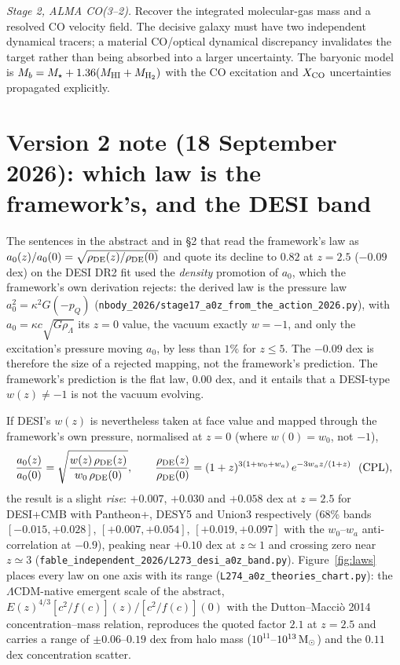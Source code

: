 \documentclass[11pt,letterpaper]{article}
\begin{document}
\emph{Stage 2, ALMA CO(3--2).} Recover the integrated molecular-gas mass and a resolved CO velocity field. The decisive galaxy must have two independent dynamical tracers; a material CO/optical dynamical discrepancy invalidates the target rather than being absorbed into a larger uncertainty. The baryonic model is $M_b=M_\star+1.36(M_{\rm HI}+M_{\rm H_2})$ with the CO excitation and $X_{\rm CO}$ uncertainties propagated explicitly.

\section*{Version 2 note (18 September 2026): which law is the framework's, and the DESI band}
The sentences in the abstract and in \S2 that read the framework's law as $a_0(z)/a_0(0)=\sqrt{\rho_{\rm DE}(z)/\rho_{\rm DE}(0)}$ and quote its decline to $0.82$ at $z=2.5$ ($-0.09$ dex) on the DESI DR2 fit used the \emph{density} promotion of $a_0$, which the framework's own derivation rejects: the derived law is the pressure law $a_0^2=\kappa^2G(-p_Q)$ (\texttt{nbody\_2026/}\allowbreak\texttt{stage17\_a0z\_from\_the\_action\_2026.py}), with $a_0=\kappa c\sqrt{G\rho_\Lambda}$ its $z=0$ value, the vacuum exactly $w=-1$, and only the excitation's pressure moving $a_0$, by less than $1\%$ for $z\le5$. The $-0.09$ dex is therefore the size of a rejected mapping, not the framework's prediction. The framework's prediction is the flat law, $0.00$ dex, and it entails that a DESI-type $w(z)\neq-1$ is not the vacuum evolving.

If DESI's $w(z)$ is nevertheless taken at face value and mapped through the framework's own pressure, normalised at $z=0$ (where $w(0)=w_0$, not $-1$),
\begin{equation}
\frac{a_0(z)}{a_0(0)}=\sqrt{\frac{w(z)\,\rho_{\rm DE}(z)}{w_0\,\rho_{\rm DE}(0)}},\qquad \frac{\rho_{\rm DE}(z)}{\rho_{\rm DE}(0)}=(1+z)^{3(1+w_0+w_a)}\,e^{-3w_az/(1+z)}\ \ \text{(CPL)},
\end{equation}
the result is a slight \emph{rise}: $+0.007$, $+0.030$ and $+0.058$ dex at $z=2.5$ for DESI+CMB with Pantheon+, DESY5 and Union3 respectively (68\% bands $[-0.015,+0.028]$, $[+0.007,+0.054]$, $[+0.019,+0.097]$ with the $w_0$--$w_a$ anti-correlation at $-0.9$), peaking near $+0.10$ dex at $z\simeq1$ and crossing zero near $z\simeq3$ (\texttt{fable\_independent\_2026/}\allowbreak\texttt{L273\_desi\_a0z\_band.py}). Figure~\ref{fig:laws} places every law on one axis with its range (\texttt{L274\_a0z\_theories\_chart.py}): the $\Lambda$CDM-native emergent scale of the abstract, $E(z)^{4/3}[c^2/f(c)](z)/[c^2/f(c)](0)$ with the Dutton--Macci\`o 2014 concentration--mass relation, reproduces the quoted factor $2.1$ at $z=2.5$ and carries a range of $\pm0.06$--$0.19$ dex from halo mass ($10^{11}$--$10^{13}\,{\rm M}_\odot$) and the $0.11$ dex concentration scatter.
\end{document}
